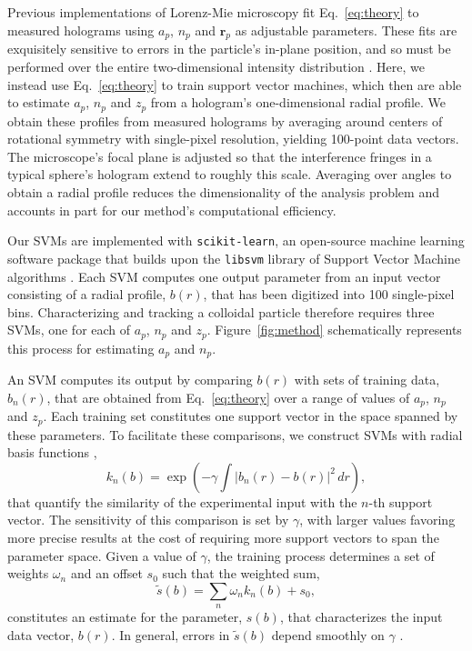 \documentclass[10pt,letterpaper]{article}
\renewcommand{\vec}[1]{\mathbf{#1}}
\newcommand{\abs}[1]{\left\vert #1 \right\vert}
\begin{document}
Previous implementations of Lorenz-Mie microscopy \cite{lee07a} 
fit Eq.~\eqref{eq:theory} to measured holograms using $a_p$, $n_p$
and $\vec{r}_p$ as adjustable parameters.
These fits are exquisitely sensitive to errors in the particle's
in-plane position, and so must be performed over the entire
two-dimensional intensity distribution \cite{lee07a}.
Here, we instead use Eq.~\eqref{eq:theory} to train
support vector machines, which then are able to estimate 
$a_p$, $n_p$ and $z_p$ from a hologram's one-dimensional
radial profile.
We obtain these profiles from measured holograms by averaging
around centers of rotational symmetry \cite{krishnatreya14a}
with single-pixel resolution, yielding 100-point data vectors.
The microscope's focal plane is adjusted so that the interference
fringes in a typical sphere's hologram extend to roughly this scale.
Averaging over angles to obtain a radial profile reduces the
dimensionality of the analysis problem and accounts in
part for our method's computational efficiency.

Our SVMs are 
implemented with {\tt scikit-learn}, an open-source
machine learning software package \cite{pedregosa11} that
builds upon the {\tt libsvm} library of Support Vector Machine algorithms
\cite{chang01,chang02}.
Each SVM computes one output parameter from an input vector
consisting of a radial profile, $b(r)$, that has been digitized
into 100 single-pixel bins.
Characterizing and tracking a colloidal particle therefore requires
three SVMs, one for each of $a_p$, $n_p$ and $z_p$.
Figure~\ref{fig:method} schematically represents this process
for estimating $a_p$ and $n_p$.

An SVM computes its output by comparing
$b(r)$ with sets of training data, $b_n(r)$,
that are obtained from Eq.~\eqref{eq:theory} over a range
of values of $a_p$, $n_p$ and $z_p$.
Each training set constitutes one support vector in the space 
spanned by these parameters.
To facilitate these comparisons,
we construct SVMs with radial basis functions
\cite{smola04},
\begin{equation}
  \label{eq:5}
  k_n(b)
  =
  \exp\left( -\gamma \int \abs{b_n(r) - b(r)}^2 \, dr \right),
\end{equation}
that quantify the similarity of the experimental input with
the $n$-th support vector.
The sensitivity of this comparison is set by $\gamma$, with
larger values favoring more precise results at the cost of requiring
more support vectors to span the parameter space.
Given a value of $\gamma$,
the training process determines a set of weights $\omega_n$
and an offset $s_0$
such that the weighted sum, 
\begin{equation}
  \label{eq:estimate}
  \tilde{s}(b) = \sum_n \omega_n k_n(b) + s_0,
\end{equation}
constitutes an estimate for the parameter, $s(b)$, that characterizes
the input data vector, $b(r)$.
In general, errors in $\tilde{s}(b)$ depend smoothly
on $\gamma$ \cite{smola04}.
\end{document}

